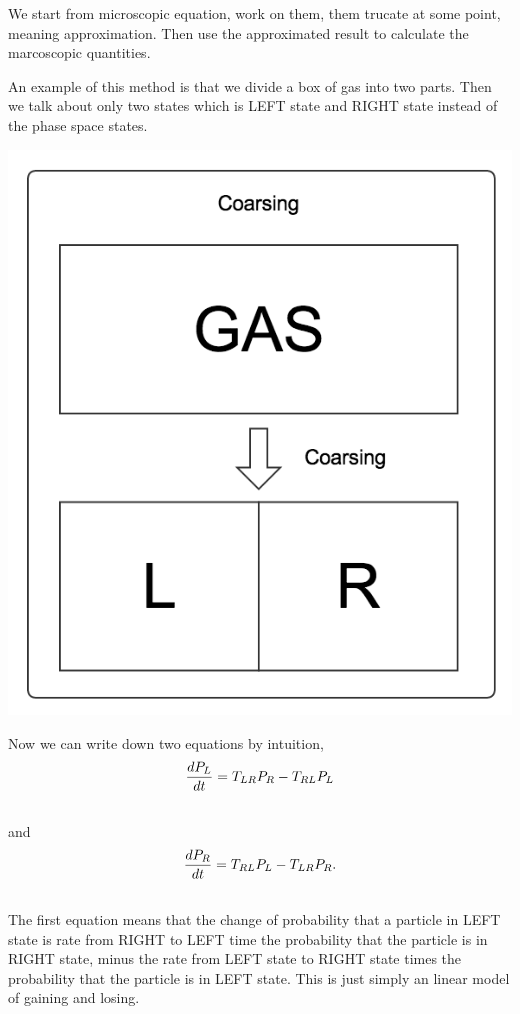 \documentclass[letterpaper,10pt,english]{sphinxmanual}
\begin{document}
We start from microscopic equation, work on them, them trucate at some point, meaning approximation. Then use the approximated result to calculate the marcoscopic quantities.

An example of this method is that we divide a box of gas into two parts. Then we talk about only two states which is LEFT state and RIGHT state instead of the phase space states.

{\hfill\includegraphics{coarseProcess.png}\hfill}

Now we can write down two equations by intuition,
\begin{gather}
\begin{split}\frac{d P_L}{d t} = T_{LR} P_R - T_{RL}P_L\end{split}\notag\\\begin{split}\end{split}\notag
\end{gather}
and
\begin{gather}
\begin{split}\frac{d P_R}{d t} = T_{RL} P_L - T_{LR}P_R .\end{split}\notag\\\begin{split}\end{split}\notag
\end{gather}
The first equation means that the change of probability that a particle in LEFT state is rate from RIGHT to LEFT time the probability that the particle is in RIGHT state, minus the rate from LEFT state to RIGHT state times the probability that the particle is in LEFT state. This is just simply an linear model of gaining and losing.
\end{document}
